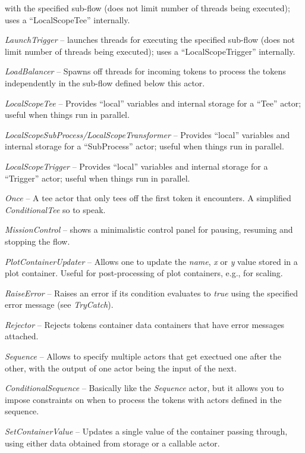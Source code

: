 \begin{tight_itemize}
	with the specified sub-flow (does not limit number of threads being executed);
	uses a ``LocalScopeTee'' internally.
	\item \textit{LaunchTrigger} -- launches threads for executing the specified
	sub-flow (does not limit number of threads being executed);
	uses a ``LocalScopeTrigger'' internally.
	\item \textit{LoadBalancer} -- Spawns off threads for incoming tokens to
	process the tokens independently in the sub-flow defined below this actor.
	\item \textit{LocalScopeTee} -- Provides ``local'' variables and internal
	storage for a ``Tee'' actor; useful when things run in parallel.
	\item \textit{LocalScopeSubProcess/LocalScopeTransformer} -- Provides ``local'' variables and internal
	storage for a ``SubProcess'' actor; useful when things run in parallel.
	\item \textit{LocalScopeTrigger} -- Provides ``local'' variables and internal
	storage for a ``Trigger'' actor; useful when things run in parallel.
	\item \textit{Once} -- A tee actor that only tees off the first token it
	encounters. A simplified \textit{ConditionalTee} so to speak.
	\item \textit{MissionControl} -- shows a minimalistic control panel
	for pausing, resuming and stopping the flow.
	\item \textit{PlotContainerUpdater} -- Allows one to update the \textit{name},
	\textit{x} or \textit{y} value stored in a plot container. Useful for
	post-processing of plot containers, e.g., for scaling.
	\item \textit{RaiseError} -- Raises an error if its condition evaluates to
	\textit{true} using the specified error message (see \textit{TryCatch}).
	\item \textit{Rejector} -- Rejects tokens container data containers that have
	error messages attached.
	\item \textit{Sequence} -- Allows to specify multiple actors that get exectued
	one after the other, with the output of one actor being the input of the next.
	\item \textit{ConditionalSequence} -- Basically like the \textit{Sequence}
	actor, but it allows you to impose constraints on when to process the tokens
	with actors defined in the sequence.
	\item \textit{SetContainerValue} -- Updates a single value of the container
	passing through, using either data obtained from storage or a callable actor.

\end{tight_itemize}
